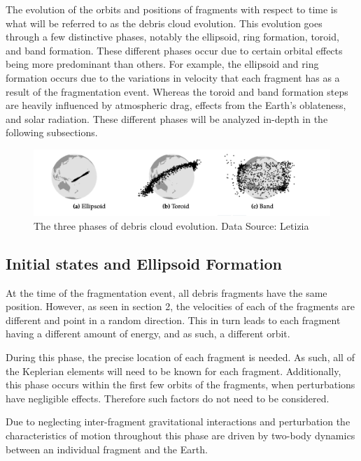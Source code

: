 \documentclass[a4paper, 12pt]{article}
\begin{document}
The evolution of the orbits and positions of fragments with respect to time is what will be referred to as the debris cloud evolution. This evolution goes through a few distinctive phases, notably the ellipsoid,  ring formation,  toroid, and band formation. These different phases occur due to certain orbital effects being more predominant than others. For example, the ellipsoid and ring formation occurs due to the variations in velocity that each fragment has as a result of the fragmentation event. Whereas the toroid and band formation steps are heavily influenced by atmospheric drag, effects from the Earth's oblateness, and solar radiation. These different phases will be analyzed in-depth in the following subsections.
\vspace{\baselineskip}

\begin{figure}[h]
	\centering
	\includegraphics[scale=0.45]{debrisphases}
	\caption{The three phases of debris cloud evolution. Data Source: Letizia}
\end{figure}


\subsection{Initial states and Ellipsoid Formation}

At the time of the fragmentation event, all debris fragments have the same position. However, as seen in section 2, the velocities of each of the fragments are different and point in a random direction. This in turn leads to each fragment having a different amount of energy, and as such, a different orbit. 

During this phase, the precise location of each fragment is needed. As such,  all of the Keplerian elements will need to be known for each fragment. Additionally, this phase occurs within the first few orbits of the fragments, when perturbations have negligible effects. Therefore such factors do not need to be considered.

Due to neglecting inter-fragment gravitational interactions and perturbation the characteristics of motion throughout this phase are driven by two-body dynamics between an individual fragment and the Earth.
\end{document}
